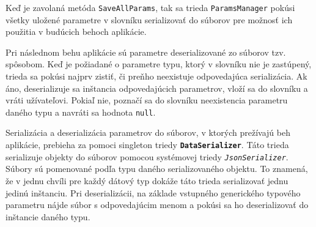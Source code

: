 Keď je zavolaná metóda \texttt{SaveAllParams}, tak sa trieda \texttt{ParamsManager} pokúsi všetky uložené parametre v slovníku serializovať do súborov pre možnosť ich použitia v budúcich behoch aplikácie.

Pri následnom behu aplikácie sú parametre deserializované zo súborov tzv.  spôsobom. Keď je požiadané o parametre typu, ktorý v slovníku nie je zastúpený, trieda sa pokúsi najprv zistiť, či preňho neexistuje odpovedajúca serializácia. Ak áno, deserializuje sa inštancia odpovedajúcich parametrov, vloží sa do slovníku a vráti užívateľovi. Pokiaľ nie, poznačí sa do slovníku neexistencia parametru daného typu a navráti sa hodnota \texttt{null}.  

Serializácia a deserializácia parametrov do súborov, v ktorých prežívajú beh aplikácie, prebieha za pomoci singleton triedy \textbf{\texttt{DataSerializer}}. Táto trieda serializuje objekty do súborov pomocou systémovej triedy \textit{\texttt{JsonSerializer}}. Súbory sú pomenované podľa typu daného serializovaného objektu. To znamená, že v jednu chvíli pre každý dátový typ dokáže táto trieda serializovať jednu jedinú inštanciu. Pri deserializácii, na základe vstupného generického typového parametru nájde súbor s odpovedajúcim menom a pokúsi sa ho deserializovať do inštancie daného typu.


  